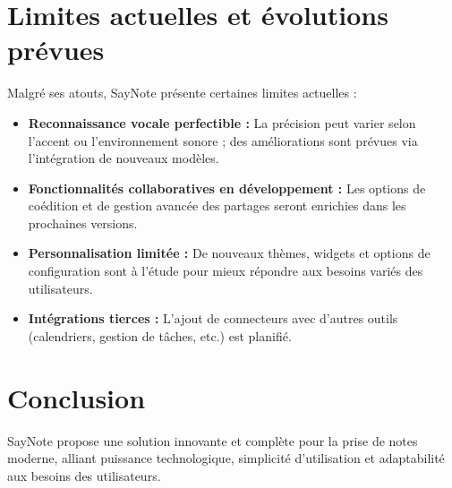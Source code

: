 \section{Limites actuelles et évolutions prévues}
Malgré ses atouts, SayNote présente certaines limites actuelles :
\begin{itemize}
    \item \textbf{Reconnaissance vocale perfectible :} La précision peut varier selon l’accent ou l’environnement sonore ; des améliorations sont prévues via l’intégration de nouveaux modèles.
    \item \textbf{Fonctionnalités collaboratives en développement :} Les options de coédition et de gestion avancée des partages seront enrichies dans les prochaines versions.
    \item \textbf{Personnalisation limitée :} De nouveaux thèmes, widgets et options de configuration sont à l’étude pour mieux répondre aux besoins variés des utilisateurs.
    \item \textbf{Intégrations tierces :} L’ajout de connecteurs avec d’autres outils (calendriers, gestion de tâches, etc.) est planifié.
\end{itemize}

\section*{Conclusion}
SayNote propose une solution innovante et complète pour la prise de notes moderne, alliant puissance technologique, simplicité d’utilisation et adaptabilité aux besoins des utilisateurs.
